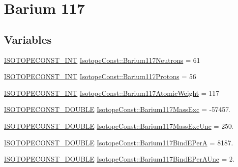 \hypertarget{group___isotope_const-_barium-_ba117}{}\section{Barium 117}
\label{group___isotope_const-_barium-_ba117}
\subsection*{Variables}
\begin{DoxyCompactItemize}
\item 
\mbox{\hyperlink{group___isotope_const-_macros_ga5f18360b3e99483a35c32d789e62621c}{I\+S\+O\+T\+O\+P\+E\+C\+O\+N\+S\+T\+\_\+\+I\+NT}} \mbox{\hyperlink{group___isotope_const-_barium-_ba117_gaa6f2687a5e7e70749087d0e7b5238ef2}{Isotope\+Const\+::\+Barium117\+Neutrons}} = 61
\item 
\mbox{\hyperlink{group___isotope_const-_macros_ga5f18360b3e99483a35c32d789e62621c}{I\+S\+O\+T\+O\+P\+E\+C\+O\+N\+S\+T\+\_\+\+I\+NT}} \mbox{\hyperlink{group___isotope_const-_barium-_ba117_ga26bd7477dc2f6bc35138b65e3eec74ca}{Isotope\+Const\+::\+Barium117\+Protons}} = 56
\item 
\mbox{\hyperlink{group___isotope_const-_macros_ga5f18360b3e99483a35c32d789e62621c}{I\+S\+O\+T\+O\+P\+E\+C\+O\+N\+S\+T\+\_\+\+I\+NT}} \mbox{\hyperlink{group___isotope_const-_barium-_ba117_gaf6daa2e9b526404340aab3cd645f2d76}{Isotope\+Const\+::\+Barium117\+Atomic\+Weight}} = 117
\item 
\mbox{\hyperlink{group___isotope_const-_macros_ga8f45a7272ce02c0b4c65c44636ed719a}{I\+S\+O\+T\+O\+P\+E\+C\+O\+N\+S\+T\+\_\+\+D\+O\+U\+B\+LE}} \mbox{\hyperlink{group___isotope_const-_barium-_ba117_ga8d77f0e5d77ffb5cb61d1d70c5f85635}{Isotope\+Const\+::\+Barium117\+Mass\+Exc}} = -\/57457.
\item 
\mbox{\hyperlink{group___isotope_const-_macros_ga8f45a7272ce02c0b4c65c44636ed719a}{I\+S\+O\+T\+O\+P\+E\+C\+O\+N\+S\+T\+\_\+\+D\+O\+U\+B\+LE}} \mbox{\hyperlink{group___isotope_const-_barium-_ba117_ga5e5c9c42b74f3c5ff88e09005ae6c1e8}{Isotope\+Const\+::\+Barium117\+Mass\+Exc\+Unc}} = 250.
\item 
\mbox{\hyperlink{group___isotope_const-_macros_ga8f45a7272ce02c0b4c65c44636ed719a}{I\+S\+O\+T\+O\+P\+E\+C\+O\+N\+S\+T\+\_\+\+D\+O\+U\+B\+LE}} \mbox{\hyperlink{group___isotope_const-_barium-_ba117_gaa4b918e66f6d8ecf332ae23c3ed80ce1}{Isotope\+Const\+::\+Barium117\+Bind\+E\+PerA}} = 8187.
\item 
\mbox{\hyperlink{group___isotope_const-_macros_ga8f45a7272ce02c0b4c65c44636ed719a}{I\+S\+O\+T\+O\+P\+E\+C\+O\+N\+S\+T\+\_\+\+D\+O\+U\+B\+LE}} \mbox{\hyperlink{group___isotope_const-_barium-_ba117_ga2764ef306a7b01880a9272620d097878}{Isotope\+Const\+::\+Barium117\+Bind\+E\+Per\+A\+Unc}} = 2.

\end{DoxyCompactItemize}
